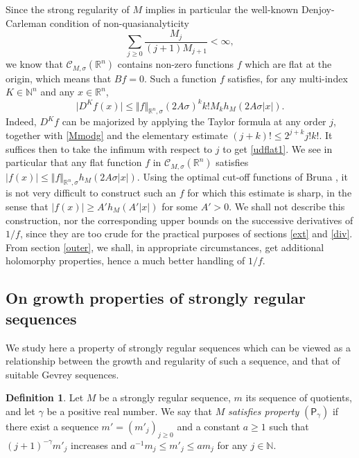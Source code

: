 \documentclass[a4paper]{amsart}
\theoremstyle{plain}
\theoremstyle{definition}
\newtheorem{deft}[subsubsection]{Definition}
\theoremstyle{remark}
\begin{document}
Since the strong regularity of $ M $ 
implies in particular the well-known Denjoy-Carleman condition of non-quasianalyticity
\begin{equation}\label{Denjoy}
\sum_{j\geq 0}\frac{M_j}{(j+1)M_{j+1}}<\infty,
\end{equation}
we know that $ \mathcal{C}_{M,\sigma}(\mathbb{R}^n) $ contains non-zero functions $ f $ which are flat at the origin, which means that $ Bf=0 $. Such a function $ f $ satisfies, for any multi-index $ K\in\mathbb{N}^n $ and any $ x\in\mathbb{R}^n $, 
\begin{equation}\label{udflat1}
\vert D^Kf(x)\vert \leq \Vert f\Vert_{\mathbb{R}^n,\sigma}(2A\sigma)^k k!M_k h_M(2A\sigma\vert x\vert).
\end{equation}
Indeed, $ D^Kf $ can be majorized by applying 
the Taylor formula at any order $ j $, together with \eqref{Mmodg} and the elementary estimate
$ (j+k)!\leq 2^{j+k}j!k! $. It suffices then to take the infimum with respect to $ j $ to
get \eqref{udflat1}.
We see in particular that any flat function $ f $ in $ \mathcal{C}_{M,\sigma}(\mathbb{R}^n) $ 
satisfies $ \vert f(x)\vert\leq \Vert f\Vert_{\mathbb{R}^n,\sigma}h_M(2A\sigma\vert x\vert) $. Using the optimal cut-off functions of Bruna \cite{Bruna}, it
is not very difficult to
construct such an $ f $ for which this estimate is sharp, in the sense
that $ \vert f(x)\vert\geq A'h_M(A'\vert x\vert) $ for some
$ A'>0 $. We shall not describe this construction, nor
the corresponding upper bounds on the successive
derivatives of $ 1/f $, since they are too crude for the
practical purposes of sections \ref{ext} and \ref{div}.
From section \ref{outer}, we shall, in appropriate circumstances,
get additional holomorphy properties, hence a much better handling of $ 1/f $.

\subsection{On growth properties of strongly regular sequences}\label{growthprop}

We study here a property of strongly regular sequences which can be viewed as
a relationship between the growth and regularity of such a sequence,
and that of suitable Gevrey sequences. 

\begin{deft}\label{Pgamma}
Let $ M $ be a strongly regular sequence, $ m $ its sequence of quotients, and let $ \gamma $ be a positive real number. We say that $ M $ \emph{satisfies property} $ (\mathsf{P}_\gamma) $ if there exist a sequence $ m'=(m'_j)_{j\geq 0} $ and a constant $ a\geq 1 $ such that 
$ (j+1)^{-\gamma}m'_j $ increases
and  $ a^{-1}m_j\leq m'_j\leq am_j $ for any $ j\in\mathbb{N} $.
\end{deft}
\end{document}
